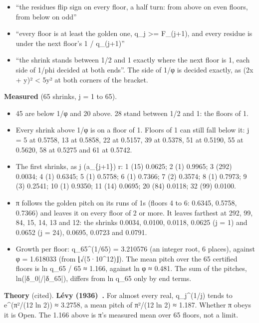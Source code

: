 \begin{itemize}
\item “the residues flip sign on every floor, a half turn: from above on even floors, from below on odd”
\item “every floor is at least the golden one, q\_\allowbreak{}j >= F\_\allowbreak{}(j+1), and every residue is under the next floor's 1 / q\_\allowbreak{}(j+1)”
\item “the shrink stands between 1/2 and 1 exactly where the next floor is 1, each side of 1/phi decided at both ends”. The side of 1/φ is decided exactly, as (2x + y)² < 5y² at both corners of the bracket.
\end{itemize}

\textbf{Measured} (65 shrinks, j = 1 to 65).

\begin{itemize}
\item 45 are below 1/φ and 20 above. 28 stand between 1/2 and 1: the floors of 1.
\item Every shrink above 1/φ is on a floor of 1. Floors of 1 can still fall below it: j = 5 at 0.5758, 13 at 0.5858, 22 at 0.5157, 39 at 0.5378, 51 at 0.5190, 55 at 0.5620, 58 at 0.5275 and 61 at 0.5742.
\item The first shrinks, as j (a\_\allowbreak{}\{j+1\}) r: 1 (15) 0.0625; 2 (1) 0.9965; 3 (292) 0.0034; 4 (1) 0.6345; 5 (1) 0.5758; 6 (1) 0.7366; 7 (2) 0.3574; 8 (1) 0.7973; 9 (3) 0.2541; 10 (1) 0.9350; 11 (14) 0.0695; 20 (84) 0.0118; 32 (99) 0.0100.
\item π follows the golden pitch on its runs of 1s (floors 4 to 6: 0.6345, 0.5758, 0.7366) and leaves it on every floor of 2 or more. It leaves farthest at 292, 99, 84, 15, 14, 13 and 12: the shrinks 0.0034, 0.0100, 0.0118, 0.0625 (j = 1) and 0.0652 (j = 24), 0.0695, 0.0723 and 0.0791.
\item Growth per floor: q\_\allowbreak{}65\textasciicircum{}(1/65) = 3.210576 (an integer root, 6 places), against φ = 1.618033 (from ⌊√(5·10\textasciicircum{}12)⌋). The mean pitch over the 65 certified floors is ln q\_\allowbreak{}65 / 65 ≈ 1.166, against ln φ ≈ 0.481. The sum of the pitches, ln(|δ\_\allowbreak{}0|/|δ\_\allowbreak{}65|), differs from ln q\_\allowbreak{}65 only by end terms.
\end{itemize}

\textbf{Theory} (cited). \textbf{Lévy (1936)~\cite{src:L-vy-1936}.} For almost every real, q\_\allowbreak{}j\textasciicircum{}(1/j) tends to e\textasciicircum{}(π²/(12 ln 2)) ≈ 3.2758, a mean pitch of π²/(12 ln 2) ≈ 1.187. Whether π obeys it is Open. The 1.166 above is π's measured mean over 65 floors, not a limit.

